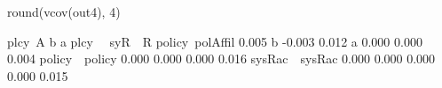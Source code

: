 \begin{Schunk}
\begin{Sinput}
 round(vcov(out4), 4)
\end{Sinput}
\begin{Soutput}
                plcy~A b      a      plcy~~ syR~~R
policy~polAffil  0.005                            
b               -0.003  0.012                     
a                0.000  0.000  0.004              
policy~~policy   0.000  0.000  0.000  0.016       
sysRac~~sysRac   0.000  0.000  0.000  0.000  0.015
\end{Soutput}
\end{Schunk}

